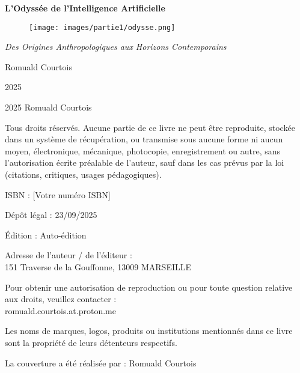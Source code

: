 \documentclass[12pt,a4paper]{book}
\begin{document}
\begin{titlepage}
    \centering
    \vspace{1cm}
    \Huge
    \textbf{L'Odyssée de l'Intelligence Artificielle}
    
    \begin{figure}[h]
        \centering
        \texttt{[image: images/partie1/odysse.png]}
    \end{figure}

    \vspace{0.5cm}
    
    \LARGE
    \textit{Des Origines Anthropologiques aux Horizons Contemporains}
    
    \vspace{2cm}

    \Large
    Romuald Courtois
    
    \vspace{2cm}
            
    \large
    2025

\end{titlepage}

\newpage
\pagestyle{empty}

\begin{center}
2025 Romuald Courtois

\bigskip

Tous droits réservés. Aucune partie de ce livre ne peut être reproduite, stockée dans un système de récupération, ou transmise sous aucune forme ni aucun moyen, électronique, mécanique, photocopie, enregistrement ou autre, sans l'autorisation écrite préalable de l'auteur, sauf dans les cas prévus par la loi (citations, critiques, usages pédagogiques).

\bigskip

ISBN : [Votre numéro ISBN]

\bigskip

Dépôt légal : 23/09/2025

\bigskip

Édition : Auto-édition

\bigskip

Adresse de l'auteur / de l'éditeur :\\
151 Traverse de la Gouffonne, 13009 MARSEILLE

\bigskip

Pour obtenir une autorisation de reproduction ou pour toute question relative aux droits, veuillez contacter :\\
romuald.courtois.at.proton.me

\bigskip

Les noms de marques, logos, produits ou institutions mentionnés dans ce livre sont la propriété de leurs détenteurs respectifs.

\bigskip

La couverture a été réalisée par : Romuald Courtois
\end{center}
\end{document}
